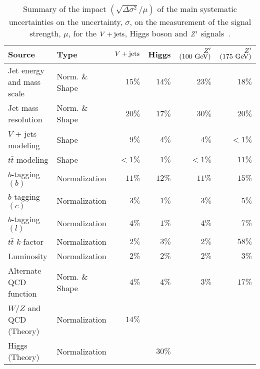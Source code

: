 \begin{table}[htpb]
 \centering
 \caption[Summary of the impact of the main systematic uncertainties on the signal strength uncertainties.]{%
  Summary of the impact $(\sqrt{\Delta \sigma^2}/\mu)$ of the main systematic uncertainties on the uncertainty, $\sigma$, on the measurement of the signal strength, $\mu$, for the $V + \text{jets}$, Higgs boson and $Z^{\prime}$ signals~\cite{ATLAS-CONF-2018-052}.}
 \begin{adjustbox}{max width=\textwidth}
  \begin{tabular}{@{}llrrrr@{}}
   \toprule
   Source                    & Type           & $V + \text{jets}$ & Higgs  & $Z^{\prime}$ $\left(100~\mathrm{GeV}\right)$ & $Z^{\prime}$ $\left(175~\mathrm{GeV}\right)$ \\ \midrule
   Jet energy and mass scale & Norm. \& Shape & $15\%$   & $14\%$ & $23\%$                            & $18\%$                            \\
   Jet mass resolution       & Norm. \& Shape & $20\%$   & $17\%$ & $30\% $                           & $20\% $                           \\
   $V$ + jets modeling       & Shape          & $9\%$    & $4\%$  & $4\%$                             & $<1\%$                            \\
   $t\bar{t}$ modeling       & Shape          & $<1\%$   & $1\%$  & $<1\%$                            & $11\%$                            \\
   $b$-tagging $(b)$         & Normalization  & $11\%$   & $12\%$ & $11\%$                            & $15\%$                            \\
   $b$-tagging $(c)$         & Normalization  & $3\%$    & $1\%$  & $3\%$                             & $5\%$                             \\
   $b$-tagging $(l)$         & Normalization  & $4\%$    & $1\%$  & $4\%$                             & $7\%$                             \\
   $t\bar{t}$ $k$-factor     & Normalization  & $2\%$    & $3\%$  & $2\%$                             & $58\%$                            \\
   Luminosity                & Normalization  & $2\%$    & $2\%$  & $2\%$                             & $3\%$                             \\
   Alternate QCD function    & Norm. \& Shape & $4\%$    & $4\%$  & $3\%$                             & $17\%$                            \\
   $W$/$Z$ and QCD (Theory)  & Normalization  & $14\%$   &        &                                   &                                   \\
   Higgs (Theory)            & Normalization  &          & $30\%$ &                                   &                                   \\
   \bottomrule
  \end{tabular}
 \end{adjustbox}
 \label{table:systematic_uncertainties}
\end{table}
